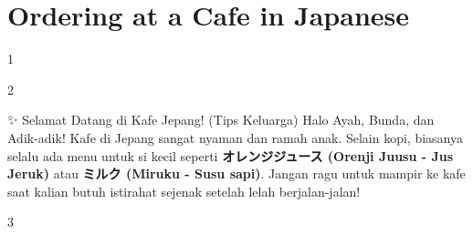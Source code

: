 ﻿\chapter{Ordering at a Cafe in Japanese}

\begin{convobox}{1}
    \noindent
      

    \vspace{1.5em}
\end{convobox}

\begin{convobox}{2}
    \noindent
      
      
      
      
      
     

    \vspace{1.5em}
\end{convobox}

\begin{lessonbox}{✨ Selamat Datang di Kafe Jepang! (Tips Keluarga)}
    Halo Ayah, Bunda, dan Adik-adik! Kafe di Jepang sangat nyaman dan ramah anak. Selain kopi, biasanya selalu ada menu untuk si kecil seperti \textbf{オレンジジュース (Orenji Juusu - Jus Jeruk)} atau \textbf{ミルク (Miruku - Susu sapi)}. Jangan ragu untuk mampir ke kafe saat kalian butuh istirahat sejenak setelah lelah berjalan-jalan!
\end{lessonbox}

\begin{convobox}{3}
    \noindent
      
      
     

    \vspace{1.5em}
\end{convobox}

